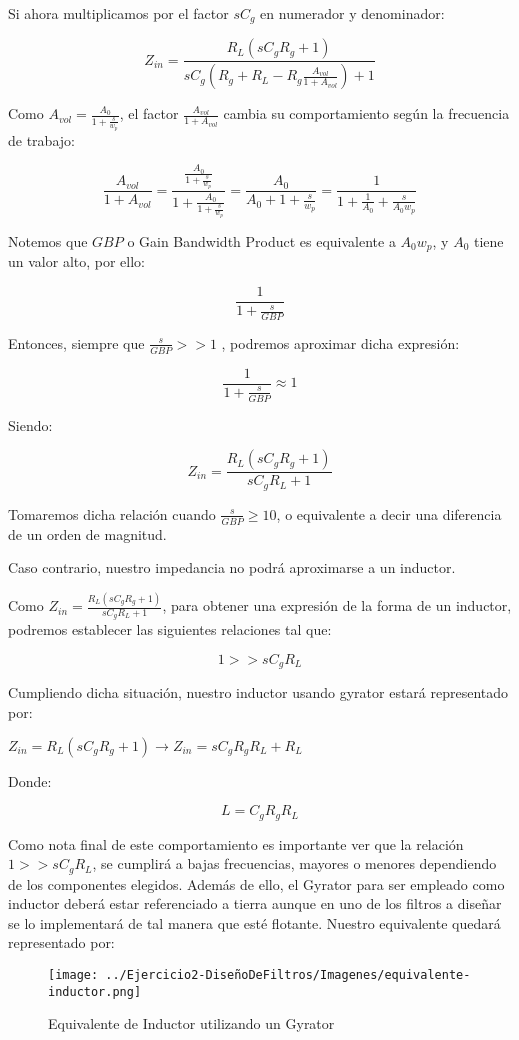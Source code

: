 Si ahora multiplicamos por el factor $sC_g$ en numerador y denominador:

$$Z_{in}=\frac{R_L(sC_gR_g+1)}{sC_g(R_g+R_L-R_g\frac{A_{vol}}{1+A_{vol}})+1}$$

Como $A_{vol}=\frac{A_0}{1+\frac{s}{w_p}}$, el factor $\frac{A_{vol}}{1+A_{vol}}$ cambia su comportamiento
según la frecuencia de trabajo:

$$\frac{A_{vol}}{1+A_{vol}}=\frac{\frac{A_0}{1+\frac{s}{w_p}}}{1+\frac{A_0}{1+\frac{s}{w_p}}}=
\frac{A_0}{A_0+1+\frac{s}{w_p}}=\frac{1}{1+\frac{1}{A_0}+\frac{s}{A_0w_p}}$$

Notemos que $GBP$ o Gain Bandwidth Product es equivalente a $A_0w_p$, y $A_0$ tiene un valor alto, por ello:

$$\frac{1}{1+\frac{s}{GBP}}$$

Entonces, siempre que $\frac{s}{GBP} >> 1$ , podremos aproximar dicha expresión:

$$\frac{1}{1+\frac{s}{GBP}} \approx 1$$

Siendo:

$$Z_{in}=\frac{R_L(sC_gR_g+1)}{sC_gR_L+1}$$

Tomaremos dicha relación cuando $\frac{s}{GBP} \geq 10$, o equivalente a decir una diferencia de un orden de magnitud.

Caso contrario, nuestro impedancia no podrá aproximarse a un inductor.

Como $Z_{in}=\frac{R_L(sC_gR_g+1)}{sC_gR_L+1}$, para obtener una expresión de la forma de un inductor,
podremos establecer las siguientes relaciones tal que:

$$1 >> sC_gR_L$$

Cumpliendo dicha situación, nuestro inductor usando gyrator estará representado por:

$Z_{in}=R_L(sC_gR_g+1)\longrightarrow Z_{in}=sC_gR_gR_L+R_L$

Donde:

$$L=C_gR_gR_L$$

Como nota final de este comportamiento es importante ver que la relación $1 >> sC_gR_L$, se cumplirá a bajas frecuencias,
mayores o menores dependiendo de los componentes elegidos. Además de ello, el Gyrator para ser empleado como inductor deberá estar
referenciado a tierra aunque en uno de los filtros a diseñar se lo implementará de tal manera que esté flotante.
Nuestro equivalente quedará representado por:

\begin{figure}[H]
    \centering
    \texttt{[image: ../Ejercicio2-DiseñoDeFiltros/Imagenes/equivalente-inductor.png]}
    \caption{Equivalente de Inductor utilizando un Gyrator}
\end{figure}

